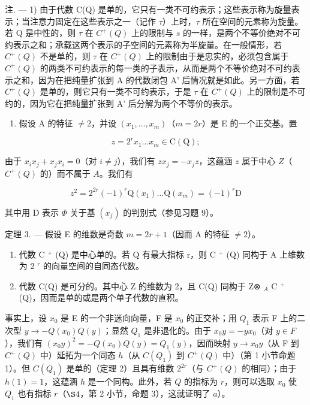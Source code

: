 注. --- 1) 由于代数 C(Q) 是单的，它只有一类不可约表示；这些表示称为旋量表示；当注意力固定在这些表示之一（记作 \(\tau\)）上时，\(\tau\) 所在空间的元素称为旋量。若 Q 是中性的，则 \(\tau\) 在 \(C^{+}(Q)\) 上的限制与 \(s\) 的一样，是两个不等价绝对不可约表示之和；承载这两个表示的子空间的元素称为半旋量。在一般情形，若 \(C^{+}(Q)\) 不是单的，则 \(\tau\) 在 \(C^{+}(Q)\) 上的限制由于是忠实的，必须包含属于 \(C^{+}(Q)\) 的两类不可约表示的每一类的子表示，从而是两个不等价绝对不可约表示之和，因为在把纯量扩张到 A 的代数闭包 A' 后情况就是如此。另一方面，若 \(C^{+}(Q)\) 是单的，则它只有一类不可约表示，于是 \(\tau\) 在 \(C^{+}(Q)\) 上的限制是不可约的，因为它在把纯量扩张到 A' 后分解为两个不等价的表示。

\begin{enumerate}
\def\labelenumi{\arabic{enumi})}
\setcounter{enumi}{1}
\tightlist
\item
  假设 A 的特征 \(\neq 2\)，并设 \((x_{1},\ldots,x_{m})\)（\(m=2r\)）是 E 的一个正交基。置
\end{enumerate}

\[
z = 2 ^ {r} x _ {1} \dots x _ {m} \in \mathrm{C(Q)};
\]

  由于 \(x_{i}x_{j} + x_{j}x_{i} = 0\)（对 \(i \neq j\)），我们有 \(zx_{j} = -x_{j}z\)，这蕴涵 \(z\) 属于中心 \(Z\)（\(C^{+}(Q)\) 的）而不属于 \(A\)。我们有

\[
z ^ {2} = 2 ^ {2 r} (- 1) ^ {r} \mathrm{Q} (x _ {1}) \dots \mathrm{Q} (x _ {m}) = (- 1) ^ {r} \mathrm{D}
\]

  其中用 D 表示 \(\Phi\) 关于基 \((x_{j})\) 的判别式（参见习题 9）。

定理 3. --- 假设 E 的维数是奇数 \(m = 2r + 1\)（因而 A 的特征 \(\neq 2\)）。

\begin{enumerate}
\def\labelenumi{\alph{enumi})}
\item
  代数 C \(^{+}\) (Q) 是中心单的。若 Q 有最大指标 r，则 C \(^{+}\) (Q) 同构于 A 上维数为 2 \(^{r}\) 的向量空间的自同态代数。
\item
  代数 C(Q) 是可分的。其中心 Z 的维数为 2，且 C(Q) 同构于 Z⊗ \(_{A}\) C \(^{+}\) (Q)，因而是单的或是两个单子代数的直积。
\end{enumerate}

  事实上，设 \(x_0\) 是 E 的一个非迷向向量，F 是 \(x_0\) 的正交补；用 \(Q_1\) 表示 F 上的二次型 \(y \to -Q(x_0)Q(y)\)；显然 \(Q_1\) 是非退化的。由于 \(x_0y = -yx_0\)（对 \(y \in F\)），我们有 \((x_0y)^2 = -Q(x_0)Q(y) = Q_1(y)\)，因而映射 \(y \to x_0y\)（从 F 到 \(C^+(Q)\) 中）延拓为一个同态 \(h\)（从 \(C(Q_1)\) 到 \(C^+(Q)\) 中）（第 1 小节命题 1）。但 \(C(Q_1)\) 是单的（定理 2）且具有维数 \(2^{2r}\)（与 \(C^{+}(Q)\) 的相同）；由于 \(h(1) = 1\)，这蕴涵 \(h\) 是一个同构。此外，若 \(Q\) 的指标为 \(r\)，则可以选取 \(x_0\) 使 \(Q_1\) 也有指标 \(r\)（\(\S 4\)，第 2 小节，命题 3），这就证明了 \(a\)）。

